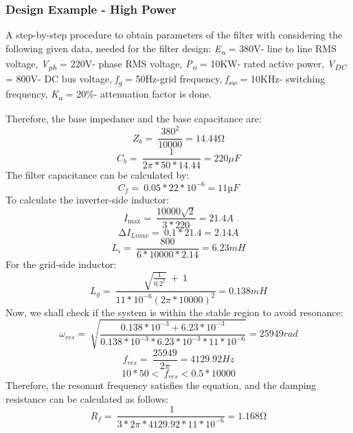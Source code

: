 \documentclass[12pt,a4paper]{book}
\begin{document}
\subsubsection{Design Example - High Power}
A step-by-step procedure to obtain parameters of the filter with considering the following given data, needed for the filter design: \emph{E\textsubscript{n}} = 380V- line to line RMS voltage, \emph{V\textsubscript{ph}} = 220V- phase RMS voltage, \emph{P\textsubscript{n}} = 10KW- rated active power, \emph{V\textsubscript{DC}} = 800V- DC bus voltage, \emph{f\textsubscript{g}} = 50Hz-grid frequency, \emph{f\textsubscript{sw}} = 10KHz- switching frequency, \emph{K\textsubscript{a }}= 20\%- attenuation factor is done.

Therefore, the base impedance and the base capacitance are:
\[Z_{b} = \ \frac{380^{2}}{10000} = 14.44\mathrm{\Omega}\]
\[C_{b} = \ \frac{1}{2\pi*50*14.44} = 220\mu F\]
The filter capacitance can be calculated by:
\[C_{f} = \ 0.05*22*10^{- 6} = 11µF\]
To calculate the inverter-side inductor:
\[I_{\max} = \ \frac{10000\sqrt{2}}{3*220} = 21.4A\]
\[{\mathrm{\Delta}I}_{Lmax} = \ 0.1*21.4 = 2.14A\]
\[L_{i} = \ \frac{800}{6*10000*2.14} = 6.23mH\]
For the grid-side inductor:
\[L_{g} = \ \frac{\sqrt{\frac{1}{{0.2}^{2}}}\  + \ 1}{11*10^{- 6}{(2\pi*10000)}^{2}} = 0.138mH\]
Now, we shall check if the system is within the stable region to avoid resonance:
\[\omega_{res} = \ \sqrt{\frac{0.138*10^{- 3} + 6.23*10^{- 3}}{0.138*10^{- 3}*6.23*10^{- 3}*11*10^{- 6}}} = 25949rad\]
\[f_{res} = \ \frac{25949}{2\pi} = 4129.92Hz\]
\[10*50 < \ f_{res} < 0.5*10000\]
Therefore, the resonant frequency satisfies the equation, and the damping resistance can be calculated as follows:
\[R_{f} = \ \frac{\ 1}{3*2\pi*4129.92*11*10^{- 6}} = 1.168\mathrm{\Omega}\]

\end{document}
